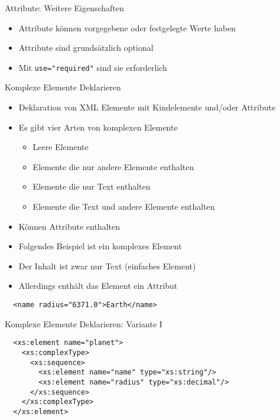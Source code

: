 \documentclass{beamer}
\begin{document}
\begin{frame}[fragile]{Attribute: Weitere Eigenschaften}
	
	\begin{itemize}
	\item Attribute können vorgegebene oder festgelegte Werte haben
	\item Attribute sind grundsätzlich optional 
	\item Mit \texttt{use="required"} sind sie erforderlich
	\end{itemize}
	
\end{frame}

\begin{frame}[fragile]{Komplexe Elemente Deklarieren}
	
	\begin{itemize}
		\item Deklaration von XML Elemente mit Kindelemente und/oder Attribute
		\item Es gibt vier Arten von komplexen Elemente
		\begin{itemize}
			\item Leere Elemente
			\item Elemente die nur andere Elemente enthalten
			\item Elemente die nur Text enthalten
			\item Elemente die Text und andere Elemente enthalten
		\end{itemize}
		\item Können Attribute enthalten
		\item Folgendes Beispiel ist ein komplexes Element
		\item Der Inhalt ist zwar nur Text (einfaches Element)
		\item Allerdings enthält das Element ein Attribut
	\end{itemize}
	
	\lstset{language=XML}
	\begin{lstlisting}	
  <name radius="6371.0">Earth</name>
	\end{lstlisting}
	
\end{frame}

\begin{frame}[fragile]{Komplexe Elemente Deklarieren: Variante I}
	
	\lstset{language=XML}
	\begin{lstlisting}	
  <xs:element name="planet">
    <xs:complexType>
      <xs:sequence>
        <xs:element name="name" type="xs:string"/>
        <xs:element name="radius" type="xs:decimal"/>
      </xs:sequence>
    </xs:complexType>
  </xs:element>
	\end{lstlisting}
	
\end{frame}
\end{document}

